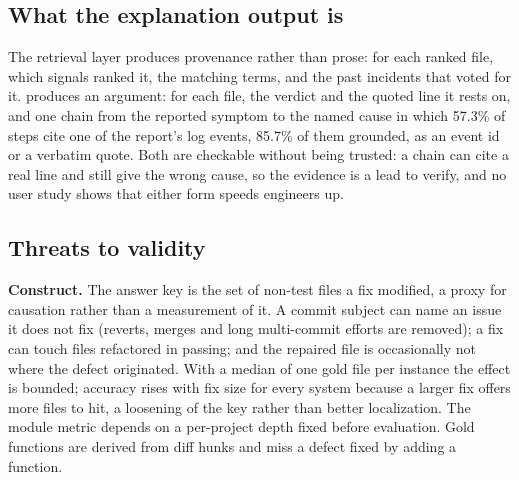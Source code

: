 \subsection{What the explanation output is}
\label{sec:discussion:explanation}

The retrieval layer produces provenance rather than prose: for each
ranked file, which signals ranked it, the matching terms, and the past
incidents that voted for it. \sys{} produces an argument: for each file, the verdict and
the quoted line it rests on, and one chain from the reported symptom to
the named cause in which 57.3\% of steps cite one of the report's log
events, 85.7\% of them grounded, as an event id or a verbatim quote.
Both are checkable without being
trusted: a chain can cite a real line and still give the wrong cause,
so the evidence is a lead to verify, and no user study shows that
either form speeds engineers up.

\subsection{Threats to validity}
\label{sec:discussion:threats}

\textbf{Construct.} The answer key is the set of non-test files a fix
modified, a proxy for causation rather than a measurement of it. A
commit subject can name an issue it does not fix (reverts, merges and
long multi-commit efforts are removed); a fix can touch files
refactored in passing; and the repaired file is occasionally not where
the defect originated. With a
median of one gold file per instance the effect is bounded; accuracy
rises with fix size for every system because a larger fix offers more
files to hit, a loosening of the key rather than better localization. The module metric depends on a per-project depth
fixed before evaluation. Gold functions are derived from diff hunks and
miss a defect fixed by adding a function.

